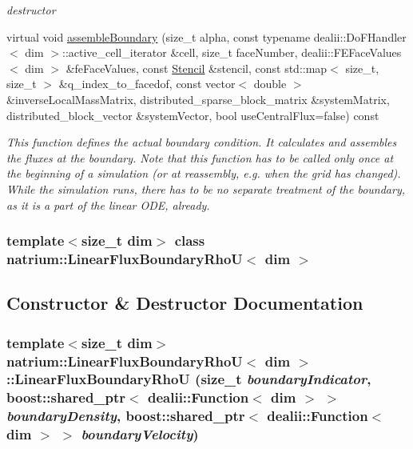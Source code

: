\begin{DoxyCompactItemize}
\begin{DoxyCompactList}\small\item\em destructor \item\end{DoxyCompactList}\item 
virtual void \hyperlink{classnatrium_1_1LinearFluxBoundaryRhoU_a4572f65018de568b40f56921e8f89788}{assembleBoundary} (size\_\-t alpha, const typename dealii::DoFHandler$<$ dim $>$::active\_\-cell\_\-iterator \&cell, size\_\-t faceNumber, dealii::FEFaceValues$<$ dim $>$ \&feFaceValues, const \hyperlink{classnatrium_1_1Stencil}{Stencil} \&stencil, const std::map$<$ size\_\-t, size\_\-t $>$ \&q\_\-index\_\-to\_\-facedof, const vector$<$ double $>$ \&inverseLocalMassMatrix, distributed\_\-sparse\_\-block\_\-matrix \&systemMatrix, distributed\_\-block\_\-vector \&systemVector, bool useCentralFlux=false) const 
\begin{DoxyCompactList}\small\item\em This function defines the actual boundary condition. It calculates and assembles the fluxes at the boundary. Note that this function has to be called only once at the beginning of a simulation (or at reassembly, e.g. when the grid has changed). While the simulation runs, there has to be no separate treatment of the boundary, as it is a part of the linear ODE, already. \item\end{DoxyCompactList}\end{DoxyCompactItemize}
\subsubsection*{template$<$size\_\-t dim$>$ class natrium::LinearFluxBoundaryRhoU$<$ dim $>$}



\subsection{Constructor \& Destructor Documentation}
\hypertarget{classnatrium_1_1LinearFluxBoundaryRhoU_a24d71dd4d58a6f1f7468db578e21222e}{
\subsubsection[{LinearFluxBoundaryRhoU}]{\setlength{\rightskip}{0pt plus 5cm}template$<$size\_\-t dim$>$ {\bf natrium::LinearFluxBoundaryRhoU}$<$ dim $>$::{\bf LinearFluxBoundaryRhoU} (size\_\-t {\em boundaryIndicator}, \/  boost::shared\_\-ptr$<$ dealii::Function$<$ dim $>$ $>$ {\em boundaryDensity}, \/  boost::shared\_\-ptr$<$ dealii::Function$<$ dim $>$ $>$ {\em boundaryVelocity})}}
\label{classnatrium_1_1LinearFluxBoundaryRhoU_a24d71dd4d58a6f1f7468db578e21222e}


